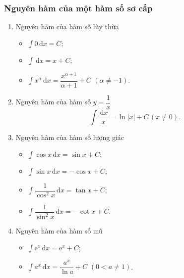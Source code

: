 \subsubsection{Nguyên hàm của một hàm số sơ cấp}
\begin{enumerate}[1.]
	\item Nguyên hàm của hàm số lũy thừa
	\begin{itemize}
		\item $\displaystyle\int{0\mathrm{\,d}x}=C$;
		\item $\displaystyle\int{\mathrm{\,d}x}=x+C$;
		\item $\displaystyle\int{x^\alpha\mathrm{\,d}x}=\dfrac{x^{\alpha+1}}{\alpha+1}+C$ $(\alpha\ne-1)$.
	\end{itemize}
\item Nguyên hàm của hàm số $y=\dfrac{1}{x}$
$$\displaystyle\int{\dfrac{\mathrm{\,d}x}{x}}=\ln|x|+C\,(x\ne0).$$
\item Nguyên hàm của hàm số lượng giác
\begin{itemize}
	\item $\displaystyle\int{\cos x\mathrm{\,d}x}=\sin x+C$;
	\item $\displaystyle\int{\sin x\mathrm{\,d}x}=-\cos x+C$;
	\item $\displaystyle\int{\dfrac{1}{\cos^2x}\mathrm{\,d}x}=\tan x+C$;
	\item $\displaystyle\int{\dfrac{1}{\sin^2x}\mathrm{\,d}x}=-\cot x+C$.
\end{itemize}
\item Nguyên hàm của hàm số mũ
\begin{itemize}
	\item $\displaystyle\int{\mathrm{e}^x\mathrm{\,d}x}=\mathrm{e}^x+C$;
	\item $\displaystyle\int{a^x\mathrm{\,d}x}=\dfrac{a^x}{\ln a}+C$ $(0<a\ne1)$.
\end{itemize}
\end{enumerate}
